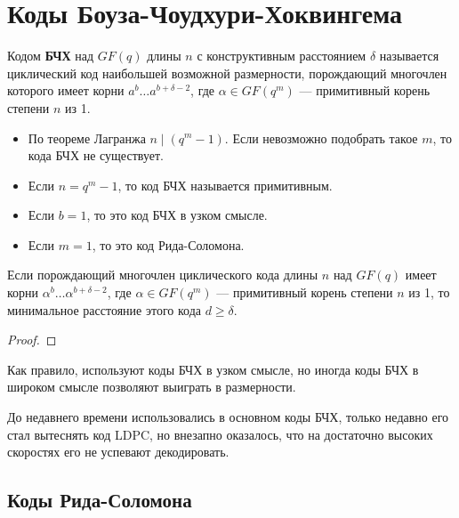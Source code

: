 \section{Коды Боуза-Чоудхури-Хоквингема}

\begin{definition}
    Кодом \textbf{БЧХ} над \(GF(q)\) длины \(n\) с конструктивным расстоянием 
    \(\delta\) называется циклический код наибольшей возможной размерности,
    порождающий многочлен которого имеет корни \(a^b \dots a^{b + \delta - 2}\),
    где \(\alpha \in GF(q^m)\) --- примитивный корень степени \(n\) из 1.
\end{definition}

\begin{remark}\itemfix
    \begin{itemize}
        \item По теореме Лагранжа \(n \mid (q^m - 1)\).
        Если невозможно подобрать такое \(m\), то кода БЧХ не существует.
        \item Если \(n = q^m - 1\), то код БЧХ называется примитивным.
        \item Если \(b = 1\), то это код БЧХ в узком смысле.
        \item Если \(m = 1\), то это код Рида-Соломона.
    \end{itemize}
\end{remark}

\begin{definition}
    Если порождающий многочлен циклического кода длины \(n\)
    над \(GF(q)\) имеет корни \(\alpha^b \dots \alpha^{b + \delta - 2}\),
    где \(\alpha \in GF(q^m)\) --- примитивный корень степени \(n\) из 1,
    то минимальное расстояние этого кода \(d \geq \delta\).
\end{definition}
\begin{proof}
    \unfinished
\end{proof}

\unfinished

Как правило, используют коды БЧХ в узком смысле,
но иногда коды БЧХ в широком смысле позволяют выиграть в размерности.

До недавнего времени использовались в основном коды БЧХ,
только недавно его стал вытеснять код LDPC, но внезапно оказалось,
что на достаточно высоких скоростях его не успевают декодировать.

\subsection{Коды Рида-Соломона}

